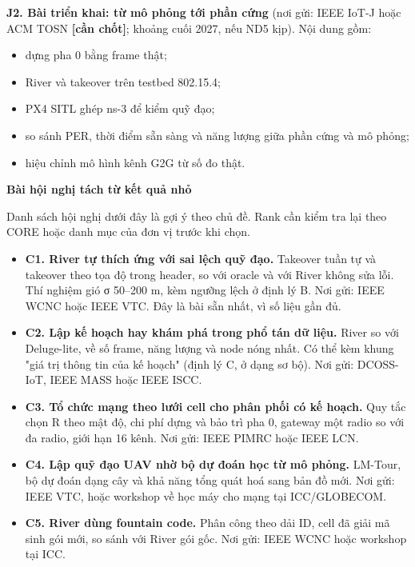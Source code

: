\textbf{J2. Bài triển khai: từ mô phỏng tới phần cứng} (nơi gửi: IEEE
IoT-J hoặc ACM TOSN \textbf{{[}cần chốt{]}}; khoảng cuối 2027, nếu ND5
kịp). Nội dung gồm:

\begin{itemize}
\tightlist
\item
  dựng pha 0 bằng frame thật;
\item
  River và takeover trên testbed 802.15.4;
\item
  PX4 SITL ghép ns-3 để kiểm quỹ đạo;
\item
  so sánh PER, thời điểm sẵn sàng và năng lượng giữa phần cứng và mô
  phỏng;
\item
  hiệu chỉnh mô hình kênh G2G từ số đo thật.
\end{itemize}

\textbf{Bài hội nghị tách từ kết quả nhỏ}

Danh sách hội nghị dưới đây là gợi ý theo chủ đề. Rank cần kiểm tra lại
theo CORE hoặc danh mục của đơn vị trước khi chọn.

\begin{itemize}
\tightlist
\item
  \textbf{C1. River tự thích ứng với sai lệch quỹ đạo.} Takeover tuần tự
  và takeover theo tọa độ trong header, so với oracle và với River không
  sửa lỗi. Thí nghiệm gió σ 50--200 m, kèm ngưỡng lệch ở định lý B. Nơi
  gửi: IEEE WCNC hoặc IEEE VTC. Đây là bài sẵn nhất, vì số liệu gần đủ.
\item
  \textbf{C2. Lập kế hoạch hay khám phá trong phổ tán dữ liệu.} River so
  với Deluge-lite, về số frame, năng lượng và node nóng nhất. Có thể kèm
  khung "giá trị thông tin của kế hoạch" (định lý C, ở dạng sơ bộ). Nơi
  gửi: DCOSS-IoT, IEEE MASS hoặc IEEE ISCC.
\item
  \textbf{C3. Tổ chức mạng theo lưới cell cho phân phối có kế hoạch.}
  Quy tắc chọn R theo mật độ, chi phí dựng và bảo trì pha 0, gateway một
  radio so với đa radio, giới hạn 16 kênh. Nơi gửi: IEEE PIMRC hoặc IEEE
  LCN.
\item
  \textbf{C4. Lập quỹ đạo UAV nhờ bộ dự đoán học từ mô phỏng.} LM-Tour,
  bộ dự đoán dạng cây và khả năng tổng quát hoá sang bản đồ mới. Nơi
  gửi: IEEE VTC, hoặc workshop về học máy cho mạng tại ICC/GLOBECOM.
\item
  \textbf{C5. River dùng fountain code.} Phân công theo dải ID, cell đã
  giải mã sinh gói mới, so sánh với River gói gốc. Nơi gửi: IEEE WCNC
  hoặc workshop tại ICC.
\end{itemize}

